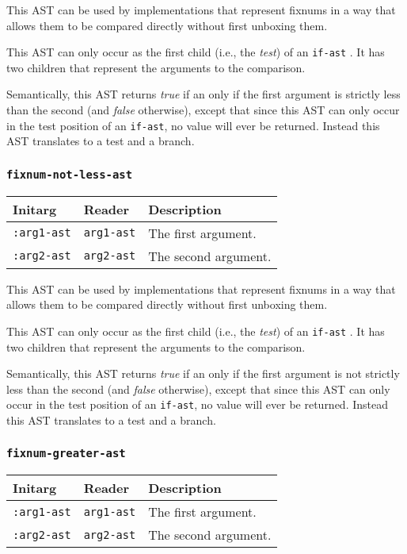 This AST can be used by implementations that represent fixnums in a
way that allows them to be compared directly without first unboxing
them.

This AST can only occur as the first child (i.e., the \emph{test}) of
an \texttt{if-ast} .  It has two children that
represent the arguments to the comparison.  

Semantically, this AST returns \emph{true} if an only if the first
argument is strictly less than the second (and \emph{false}
otherwise), except that since this AST can only occur in the test
position of an \texttt{if-ast}, no value will ever be returned.
Instead this AST translates to a test and a branch. 

\subsubsection{\texttt{fixnum-not-less-ast}}
\label{fixnum-not-less-ast}

\begin{tabular}{|l|l|l|}
\hline
Initarg & Reader & Description\\
\hline\hline
\texttt{:arg1-ast} & \texttt{arg1-ast} & The first argument.\\
\hline
\texttt{:arg2-ast} & \texttt{arg2-ast} & The second argument.\\
\hline
\end{tabular}

This AST can be used by implementations that represent fixnums in a
way that allows them to be compared directly without first unboxing
them.

This AST can only occur as the first child (i.e., the \emph{test}) of
an \texttt{if-ast} .  It has two children that
represent the arguments to the comparison.  

Semantically, this AST returns \emph{true} if an only if the first
argument is not strictly less than the second (and \emph{false}
otherwise), except that since this AST can only occur in the test
position of an \texttt{if-ast}, no value will ever be returned.
Instead this AST translates to a test and a branch. 

\subsubsection{\texttt{fixnum-greater-ast}}
\label{fixnum-greater-ast}

\begin{tabular}{|l|l|l|}
\hline
Initarg & Reader & Description\\
\hline\hline
\texttt{:arg1-ast} & \texttt{arg1-ast} & The first argument.\\
\hline
\texttt{:arg2-ast} & \texttt{arg2-ast} & The second argument.\\
\hline
\end{tabular}

